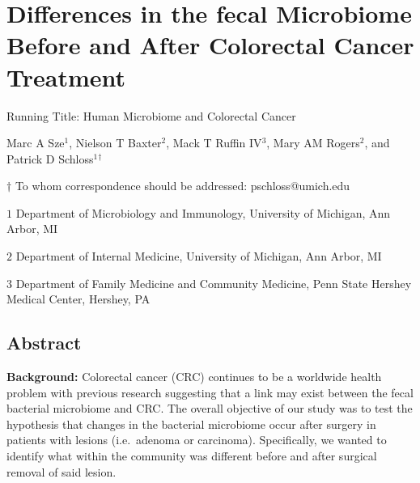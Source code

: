 \documentclass[12pt,]{article}
\title{}
\author{}
\date{}
\begin{document}
\section{Differences in the fecal Microbiome Before and After Colorectal
Cancer
Treatment}\label{differences-in-the-fecal-microbiome-before-and-after-colorectal-cancer-treatment}

\vspace{25mm}

\begin{center}
Running Title: Human Microbiome and Colorectal Cancer

\vspace{10mm}

Marc A Sze${^1}$, Nielson T Baxter${^2}$, Mack T Ruffin IV${^3}$, Mary AM Rogers${^2}$, and Patrick D Schloss${^1}$${^\dagger}$

\vspace{20mm}

$\dagger$ To whom correspondence should be addressed: pschloss@umich.edu

$1$ Department of Microbiology and Immunology, University of Michigan, Ann Arbor, MI

$2$ Department of Internal Medicine, University of Michigan, Ann Arbor, MI   

$3$ Department of Family Medicine and Community Medicine, Penn State Hershey Medical Center, Hershey, PA    


\end{center}

\newpage

\linenumbers

\subsection{Abstract}\label{abstract}

\textbf{Background:} Colorectal cancer (CRC) continues to be a worldwide
health problem with previous research suggesting that a link may exist
between the fecal bacterial microbiome and CRC. The overall objective of
our study was to test the hypothesis that changes in the bacterial
microbiome occur after surgery in patients with lesions (i.e.~adenoma or
carcinoma). Specifically, we wanted to identify what within the
community was different before and after surgical removal of said
lesion.
\end{document}
